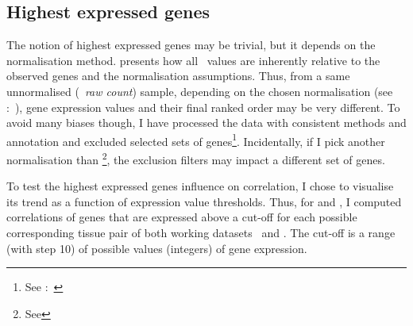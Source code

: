\subsection{Highest expressed genes}

The notion of highest expressed genes may be trivial,
but it depends on the normalisation method.
 presents how all \Rnaseq\ values are inherently relative
to the observed genes and the normalisation assumptions.
Thus, from a same unnormalised (\ie\ \emph{raw count}) sample,
depending on the chosen normalisation
(see :~),
gene expression values and their final ranked order may be very different.
To avoid many biases though,
I have processed the data with consistent methods and annotation
and excluded selected sets of
genes\footnote{See :~}.
Incidentally, if I pick another normalisation than \FPKM\footnote{See
},
the exclusion filters may impact a different set of genes.

To test the highest expressed genes influence on correlation,
I chose to visualise its trend as a function of expression value thresholds.
Thus, for  and ,
I computed correlations of genes that are expressed above a cut-off
for each possible corresponding tissue pair of both working datasets \setOne\ and \setTwo.
The cut-off is a range (with step 10) of possible values (integers) of gene expression.

